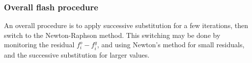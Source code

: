 
\subsubsection{Overall flash procedure}

An overall procedure is to apply successive substitution for a few
iterations, then switch to the Newton-Raphson method. This switching
may be done by monitoring the residual $f_i^o-f_i^g$, and using
Newton's method for small residuals, and the successive substitution
for larger values.



